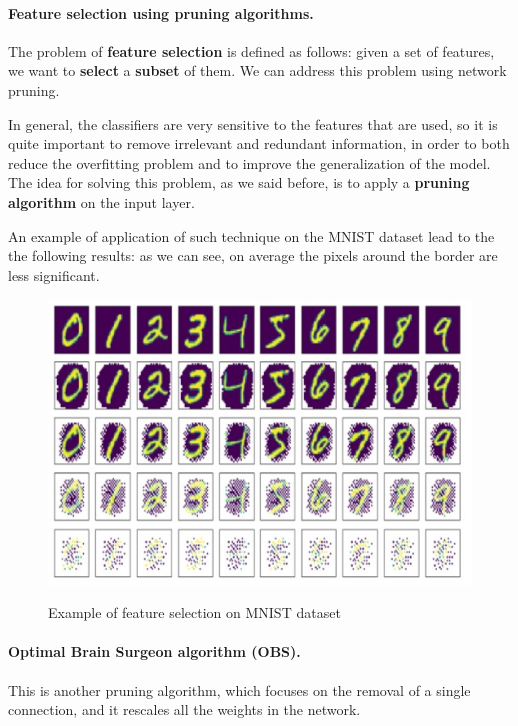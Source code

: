 \paragraph{Feature selection using pruning algorithms.}
The problem of \textbf{feature selection} is defined as follows: given a set of features, we want to \textbf{select} a \textbf{subset} of them. We can address this problem using network pruning.

In general, the classifiers are very sensitive to the features that are used, so it is quite important to remove irrelevant and redundant information, in order to both reduce the overfitting problem and to improve the generalization of the model. The idea for solving this problem, as we said before, is to apply a \textbf{pruning algorithm} on the input layer.

An example of application of such technique on the MNIST dataset lead to the the following results: as we can see, on average the pixels around the border are less significant.

\begin{figure}[h!]
		\centering
        \includegraphics[scale = 1.0]{img/mnist reduced.jpg}
		\label{mi}
        \caption{Example of feature selection on MNIST dataset}
\end{figure}

\paragraph{Optimal Brain Surgeon algorithm (OBS).} This is another pruning algorithm, which focuses on the removal of a single connection, and it rescales all the weights in the network.

